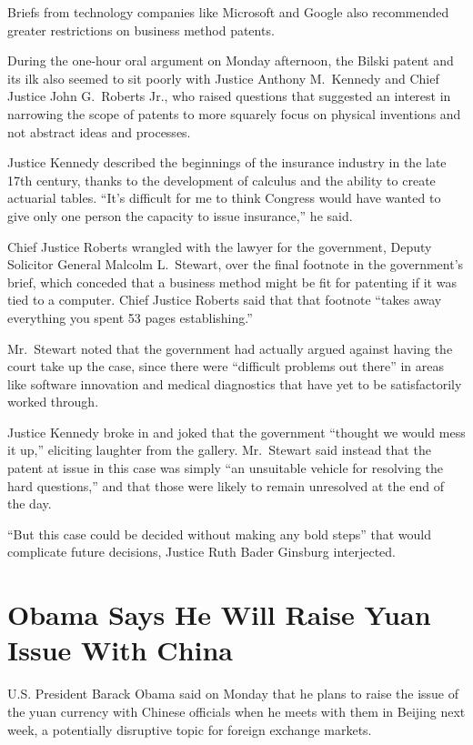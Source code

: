 ﻿\documentclass[12pt]{article}
\begin{document}
Briefs from technology companies like Microsoft and Google also recommended greater restrictions on
business method patents.

During the one-hour oral argument on Monday afternoon, the Bilski patent and its ilk also seemed to
sit poorly with Justice Anthony M.~Kennedy and Chief Justice John G.~Roberts Jr., who raised
questions that suggested an interest in narrowing the scope of patents to more squarely focus on
physical inventions and not abstract ideas and processes.

Justice Kennedy described the beginnings of the insurance industry in the late 17th century, thanks
to the development of calculus and the ability to create actuarial tables. ``It's difficult for me
to think Congress would have wanted to give only one person the capacity to issue insurance,'' he
said.

Chief Justice Roberts wrangled with the lawyer for the government, Deputy Solicitor General Malcolm
L.~Stewart, over the final footnote in the government's brief, which conceded\cite{concede} that a
business method might be fit for patenting if it was tied to a computer. Chief Justice Roberts said
that that footnote ``takes away everything you spent 53 pages establishing.''

Mr.~Stewart noted that the government had actually argued against having the court take up the case,
since there were ``difficult problems out there'' in areas like software innovation and medical
diagnostics that have yet to be satisfactorily worked through.

Justice Kennedy broke in and joked that the government ``thought we would mess it up,'' eliciting
laughter from the gallery. Mr.~Stewart said instead that the patent at issue in this case was simply
``an unsuitable vehicle for resolving the hard questions,'' and that those were likely to remain
unresolved at the end of the day.

``But this case could be decided without making any bold steps'' that would complicate future
decisions, Justice Ruth Bader Ginsburg interjected.

\section{Obama Says He Will Raise Yuan Issue With China}

\lettrine{U}{}.S. President Barack Obama said on Monday that he plans to
raise the issue of the yuan currency with Chinese officials when he meets with them in Beijing next
week, a potentially disruptive topic for foreign exchange markets.
\end{document}
